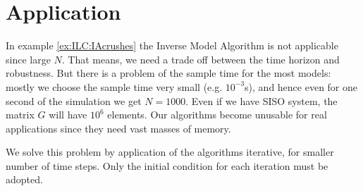 \chapter{Application}


	In example \ref{ex:ILC:IAcrushes} the Inverse Model Algorithm is not applicable since large $N$. 	
	That means, we need a trade off between the time horizon and robustness. 
	But there is a problem of the sample time for the most models: mostly we choose the sample time very small (e.g. $10^{-3}$s), and hence even for one second of the simulation we get $N = 1000$. Even if we have SISO system, the matrix $G$ will have $10^6$ elements. Our algorithms become unusable for real applications since they need vast masses of memory.   
	
	We solve this problem by application of the algorithms iterative, for smaller number of time steps. Only the initial condition for each iteration must be adopted. 
	
	